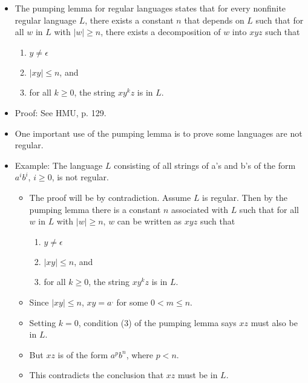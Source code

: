 \documentclass[]{article}
\begin{document}
  \begin{itemize}
    \item The pumping lemma for regular languages states that for every
    nonfinite regular language $L$, there exists a constant $n$ that depends on
    $L$ such that for all $w$ in $L$ with $|w| \geq n$, there exists a
    decomposition of $w$ into $xyz$ such that
      \begin{enumerate}
        \item $y \neq \epsilon$
        \item $|xy| \leq n$, and
        \item for all $k \geq 0$, the string $xy^kz$ is in $L$.
      \end{enumerate}
    \item Proof: See HMU, p. 129.
    \item One important use of the pumping lemma is to prove some languages are
    not regular.
    \item Example: The language $L$ consisting of all strings of a's and b's of
    the form $a^ib^i$, $i \geq 0$, is not regular.
      \begin{itemize}
        \item The proof will be by contradiction. Assume $L$ is regular. Then by
        the pumping lemma there is a constant $n$ associated with $L$ such that
        for all $w$ in $L$ with $|w| \geq n$, $w$ can be written as $xyz$ such
        that
          \begin{enumerate}
            \item $y \neq \epsilon$
            \item $|xy| \leq n$, and
            \item for all $k \geq 0$, the string $xy^kz$ is in $L$.
          \end{enumerate}
        \item Since $|xy| \leq n$, $xy = a^,$ for some $0 < m \leq n$.
        \item Setting $k = 0$, condition (3) of the pumping lemma says $xz$ must
        also be in $L$.
        \item But $xz$ is of the form $a^pb^n$, where $p < n$.
        \item This contradicts the conclusion that $xz$ must be in $L$.
      \end{itemize}
  \end{itemize}
\end{document}

